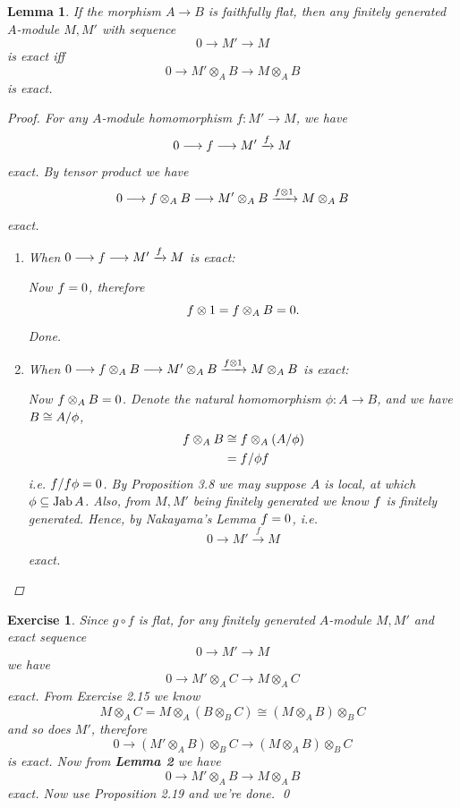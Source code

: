 \documentclass{article}
\theoremstyle{breakstyle}
\newtheorem{exercise}{Exercise}
\newtheorem{lemma}{Lemma}
\let\ker\relax
\DeclareMathOperator{\ker}{Ker}
\DeclareMathOperator{\jab}{Jab}
\begin{document}
\begin{lemma}
    If the morphism $A\longrightarrow B$ is faithfully flat,
    then any finitely generated $A$-module $M,M'$ with sequence
    $$
    0\longrightarrow M'\longrightarrow M
    $$
    is exact iff
    $$
    0\longrightarrow M'\otimes _{A}B\longrightarrow M\otimes _{A}B
    $$
    is exact.
\begin{proof}
    For any $A$-module homomorphism $f:M'\longrightarrow M$, we have
    $$
    0\longrightarrow \ker{f}\longrightarrow M'\xrightarrow[]{f} M
    $$
    exact.
    By tensor product we have
    $$
    0\longrightarrow \ker{f}\otimes _{A}B\longrightarrow M'\otimes _{A}B\xrightarrow[]{f\otimes 1} M\otimes _{A}B
    $$
    exact.
    \begin{enumerate}[label=({\roman*})]
        \item When $0\longrightarrow \ker{f}\longrightarrow M'\xrightarrow[]{f} M$ is exact:

            Now $\ker{f}=0$, therefore
            $$
            \ker{f\otimes 1}=\ker{f}\otimes _{A}B=0
            .$$
            Done.
        \item When $0\longrightarrow \ker{f}\otimes _{A}B\longrightarrow M'\otimes _{A}B\xrightarrow[]{f\otimes 1} M\otimes _{A}B$ is exact:

            Now $\ker{f}\otimes _{A}B=0$.
            Denote the natural homomorphism $\phi:A\longrightarrow B$, and we have $B\cong A / \ker{\phi}$,
            \begin{align*}
                \ker{f}\otimes _{A}B
                &\cong \ker{f}\otimes _{A}\left( A / \ker{\phi} \right)  \\
                &= \ker{f} / \ker{\phi}\ker{f}
            \end{align*}
            i.e. $\ker{f} / \ker{f}\ker{\phi}=0$.
            By \emph{Proposition 3.8} we may suppose $A$ is local, at which $\ker{\phi}\subseteq \jab{A}$.
            Also, from $M,M'$ being finitely generated we know $\ker{f}$ is finitely generated.
            Hence, by \emph{Nakayama's Lemma} $\ker{f}=0$, i.e.
            $$
            0\longrightarrow M'\xrightarrow[]{f} M
            $$
            exact.
    \end{enumerate}
\end{proof}
\end{lemma}

\begin{exercise}
    Since $g\circ f$ is flat,
    for any finitely generated $A$-module $M,M'$ and exact sequence
    $$
    0\longrightarrow M'\longrightarrow M
    $$
    we have
    $$
    0\longrightarrow M'\otimes _{A}C\longrightarrow M\otimes _{A}C
    $$
    exact.
    From \emph{Exercise 2.15} we know
    $$
    M\otimes _{A}C=M\otimes_{A}\left( B\otimes _{B}C \right) \cong \left( M\otimes _{A}B \right) \otimes _{B}C
    $$
    and so does $M'$, therefore
    $$
    0\longrightarrow \left( M'\otimes _{A}B \right) \otimes _{B}C\longrightarrow \left( M\otimes _{A}B \right) \otimes _{B}C
    $$
    is exact.
    Now from \textbf{Lemma 2} we have
    $$
    0\longrightarrow M'\otimes _{A}B \longrightarrow M\otimes _{A}B
    $$
    exact.
    Now use \emph{Proposition 2.19} and we're done.
    \qed
\end{exercise}
\end{document}
